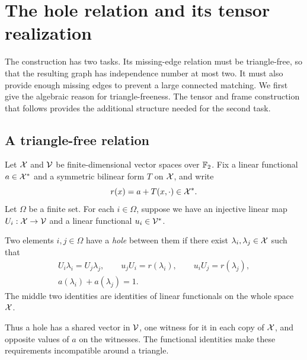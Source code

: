 \section{The hole relation and its tensor realization}\label{sec:geometry}

The construction has two tasks. Its missing-edge relation must be
triangle-free, so that the resulting graph has independence number at
most two. It must also provide enough missing edges to prevent a large
connected matching. We first give the algebraic reason for
triangle-freeness. The tensor and frame construction that follows
provides the additional structure needed for the second task.

\subsection{A triangle-free relation}

Let \(\mathcal X\) and \(\mathcal V\) be finite-dimensional vector spaces over
\(\mathbb F_2\). Fix a linear functional \(a\in\mathcal X^*\) and a symmetric
bilinear form \(T\) on \(\mathcal X\), and write
\[
 r(x)=a+T(x,\cdot)\in\mathcal X^*.
\]
Let \(\Omega\) be a finite set. For each \(i\in\Omega\), suppose
we have an injective linear map \(U_i:\mathcal X\to\mathcal V\) and a linear
functional \(u_i\in\mathcal V^*\).

\begin{definition}\label{def:hole}
Two elements \(i,j\in\Omega\) have a \emph{hole} between them if
there exist \(\lambda_i,\lambda_j\in\mathcal X\) such that
\begin{equation}\label{eq:hole-equations}
 \begin{gathered}
 U_i\lambda_i=U_j\lambda_j,\qquad
 u_jU_i=r(\lambda_i),\qquad u_iU_j=r(\lambda_j),\\
 a(\lambda_i)+a(\lambda_j)=1.
 \end{gathered}
\end{equation}
The middle two identities are identities of linear functionals on
the whole space \(\mathcal X\).
\end{definition}

Thus a hole has a shared vector in \(\mathcal V\), one witness for it in
each copy of \(\mathcal X\), and opposite values of \(a\) on the witnesses.
The functional identities make these requirements incompatible around
a triangle.

